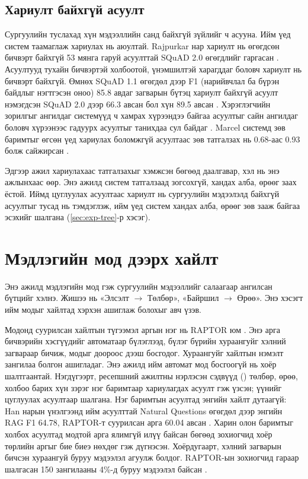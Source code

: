 \subsection{Хариулт байхгүй асуулт}
\label{sec:lit-unanswerable}

Сургуулийн туслахад хүн мэдээллийн санд байхгүй зүйлийг ч асууна. Ийм үед систем таамаглаж хариулах нь аюултай. Rajpurkar нар хариулт нь өгөгдсөн бичвэрт байхгүй 53 мянга гаруй асуулттай SQuAD 2.0 өгөгдлийг гаргасан \cite{rajpurkar2018squad2}. Асуултууд тухайн бичвэртэй холбоотой, үнэмшилтэй харагддаг боловч хариулт нь бичвэрт байхгүй. Өмнөх SQuAD 1.1 өгөгдөл дээр F1 (нарийвчлал ба бүрэн байдлыг нэгтгэсэн оноо) 85.8 авдаг загварын бүтэц хариулт байхгүй асуулт нэмэгдсэн SQuAD 2.0 дээр 66.3 авсан бол хүн 89.5 авсан \cite{rajpurkar2018squad2}. Хэрэглэгчийн зорилгыг ангилдаг системүүд ч хамрах хүрээндээ байгаа асуултыг сайн ангилдаг боловч хүрээнээс гадуурх асуултыг танихдаа сул байдаг \cite{larson2019clinc}. Marcel системд зөв баримтыг өгсөн үед хариулах боломжгүй асуултаас зөв татгалзах нь 0.68-аас 0.93 болж сайжирсан \cite{trienes2025marcel}.

Эдгээр ажил хариулахаас татгалзахыг хэмжсэн бөгөөд даалгавар, хэл нь энэ ажлынхаас өөр. Энэ ажилд систем татгалзаад зогсохгүй, хандах алба, өрөөг заах ёстой. Иймд цуглуулах асуултаас хариулт нь сургуулийн мэдээлэлд байхгүй асуултыг тусад нь тэмдэглэж, ийм үед систем хандах алба, өрөөг зөв зааж байгаа эсэхийг шалгана (\ref{sec:exp-tree}-р хэсэг).

\section{Мэдлэгийн мод дээрх хайлт}
\label{sec:lit-tree}

Энэ ажилд мэдлэгийн мод гэж сургуулийн мэдээллийг салаагаар ангилсан бүтцийг хэлнэ. Жишээ нь «Элсэлт $\rightarrow$ Төлбөр», «Байршил $\rightarrow$ Өрөө». Энэ хэсэгт ийм модыг хайлтад хэрхэн ашиглаж болохыг авч үзэв.

Модонд суурилсан хайлтын түгээмэл аргын нэг нь RAPTOR юм \cite{sarthi2024raptor}. Энэ арга бичвэрийн хэсгүүдийг автоматаар бүлэглээд, бүлэг бүрийн хураангуйг хэлний загвараар бичиж, модыг доороос дээш босгодог. Хураангуйг хайлтын нэмэлт зангилаа болгон ашигладаг. Энэ ажилд ийм автомат мод босгоогүй нь хоёр шалтгаантай. Нэгдүгээрт, ресепшний ажилтны нэрлэсэн сэдвүүд () төлбөр, өрөө, холбоо барих хүн зэрэг нэг баримтаар хариулагдах асуулт гэж үзсэн; үүнийг цуглуулах асуултаар шалгана. Нэг баримтын асуултад энгийн хайлт дутаагүй: Han нарын үнэлгээнд ийм асуулттай Natural Questions өгөгдөл дээр энгийн RAG F1 64.78, RAPTOR-т суурилсан арга 60.04 авсан \cite{han2025ragvsgraphrag}. Харин олон баримтыг холбох асуултад модтой арга ялимгүй илүү байсан бөгөөд зохиогчид хоёр төрлийн аргыг бие биеэ нөхдөг гэж дүгнэсэн. Хоёрдугаарт, хэлний загварын бичсэн хураангуй буруу мэдээлэл агуулж болдог. RAPTOR-ын зохиогчид гараар шалгасан 150 зангилааны 4\%-д буруу мэдээлэл байсан \cite{sarthi2024raptor}.

